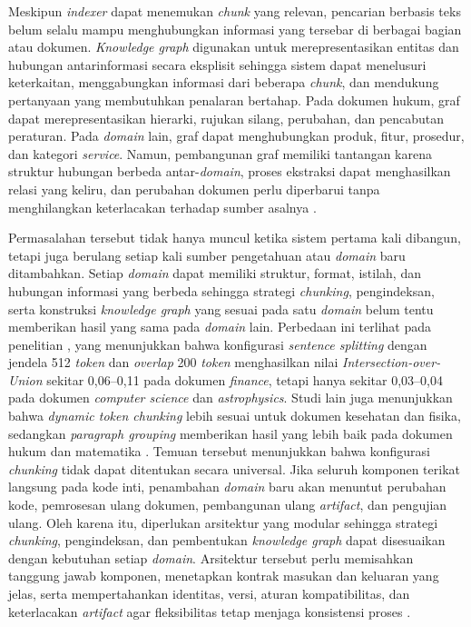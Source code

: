 Meskipun \emph{indexer} dapat menemukan \emph{chunk} yang relevan, pencarian
berbasis teks belum selalu mampu menghubungkan informasi yang tersebar di
berbagai bagian atau dokumen. \emph{Knowledge graph} digunakan untuk
merepresentasikan entitas dan hubungan antarinformasi secara eksplisit sehingga
sistem dapat menelusuri keterkaitan, menggabungkan informasi dari beberapa
\emph{chunk}, dan mendukung pertanyaan yang membutuhkan penalaran bertahap. Pada
dokumen hukum, graf dapat merepresentasikan hierarki, rujukan silang, perubahan,
dan pencabutan peraturan. Pada \emph{domain} lain, graf dapat menghubungkan produk,
fitur, prosedur, dan kategori \emph{service}. Namun, pembangunan graf memiliki
tantangan karena struktur hubungan berbeda antar-\emph{domain}, proses ekstraksi
dapat menghasilkan relasi yang keliru, dan perubahan dokumen perlu diperbarui
tanpa menghilangkan keterlacakan terhadap sumber asalnya
\parencite{edgeFromLocalGlobalGraph2024,
xuRetrievalAugmentedGenerationKnowledgeGraphs2024,
zhongComprehensiveSurveyAutomatic2023}.

Permasalahan tersebut tidak hanya muncul ketika sistem pertama kali dibangun,
tetapi juga berulang setiap kali sumber pengetahuan atau \emph{domain} baru
ditambahkan. Setiap \emph{domain} dapat memiliki struktur, format, istilah, dan
hubungan informasi yang berbeda sehingga strategi \emph{chunking}, pengindeksan,
serta konstruksi \emph{knowledge graph} yang sesuai pada satu \emph{domain}
belum tentu memberikan hasil yang sama pada \emph{domain} lain. Perbedaan ini
terlihat pada penelitian \textcite{stablerImpactChunkingDomainSpecific2025}, yang
menunjukkan bahwa konfigurasi \emph{sentence splitting} dengan jendela 512 \emph{token}
dan \emph{overlap} 200 \emph{token} menghasilkan nilai \emph{Intersection-over-Union}
sekitar 0,06--0,11 pada dokumen \emph{finance}, tetapi hanya sekitar 0,03--0,04
pada dokumen \emph{computer science} dan \emph{astrophysics}. Studi lain juga
menunjukkan bahwa \emph{dynamic token chunking} lebih sesuai untuk dokumen
kesehatan dan fisika, sedangkan \emph{paragraph grouping} memberikan hasil yang
lebih baik pada dokumen hukum dan matematika
\parencite{shaukatChunkingEmbedding2026}. Temuan tersebut menunjukkan bahwa
konfigurasi \emph{chunking} tidak dapat ditentukan secara universal. Jika seluruh
komponen terikat langsung pada kode inti, penambahan \emph{domain} baru akan
menuntut perubahan kode, pemrosesan ulang dokumen, pembangunan ulang \emph{artifact}, dan
pengujian ulang. Oleh karena itu, diperlukan arsitektur yang modular sehingga
strategi \emph{chunking}, pengindeksan, dan pembentukan \emph{knowledge graph}
dapat disesuaikan dengan kebutuhan setiap \emph{domain}. Arsitektur tersebut
perlu memisahkan tanggung jawab komponen, menetapkan kontrak masukan dan keluaran
yang jelas, serta mempertahankan identitas, versi, aturan kompatibilitas, dan
keterlacakan \emph{artifact} agar fleksibilitas tetap menjaga konsistensi proses
\parencite{hanRetrievalAugmentedGenerationGraphs2025,
gaoModularRAG2024,garlanIntroductionSoftware1994}.

